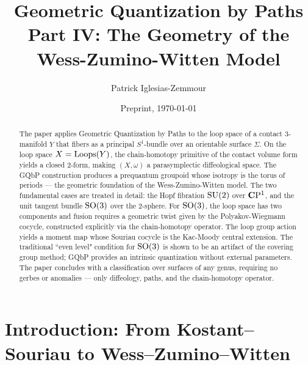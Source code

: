 \documentclass[11pt,reqno,letterpaper,twoside]{amsart}
\title[GQbP IV: WZW Model]{Geometric Quantization by Paths \\ {\scriptsize Part IV: The Geometry of the Wess-Zumino-Witten Model}}
\author{Patrick Iglesias-Zemmour}
\date{Preprint, \today}
\newcommand{\CPOne}{{\fieldC\mathrm{P}^1}}
\begin{document}
  
  
  \begin{abstract}
    The paper applies Geometric Quantization by Paths to the loop space of a contact 3-manifold $Y$ that fibers as a principal $S^1$-bundle over an orientable surface $\Sigma$.
    On the loop space $X = \operatorname{Loops}(Y)$,
    the chain-homotopy primitive of the contact volume form yields a closed 2-form, making $(X, \omega)$ a parasymplectic diffeological space.
    The GQbP construction produces a prequantum groupoid whose isotropy is the torus of periods
    --- the geometric foundation of the Wess-Zumino-Witten model.
    The two fundamental cases are treated in detail:
    the Hopf fibration $\mathrm{SU}(2)$ over $\CPOne$,
    and the unit tangent bundle $\mathrm{SO}(3)$ over the $2$-sphere.
    For $\mathrm{SO}(3)$,
    the loop space has two components and fusion requires a geometric twist given by the Polyakov-Wiegmann cocycle,
    constructed explicitly via the chain-homotopy operator.
    The loop group action yields a moment map whose Souriau cocycle is the Kac-Moody central extension.
    The traditional ``even level" condition for $\mathrm{SO}(3)$ is shown to be an artifact of the covering group method;
    GQbP provides an intrinsic quantization without external parameters.
    The paper concludes with a classification over surfaces of any genus,
    requiring no gerbes or anomalies
    --- only diffeology,
    paths,
    and the chain-homotopy operator.
  \end{abstract}
  
  
  \maketitle
  
  \section*{Introduction: From Kostant--Souriau to Wess--Zumino--Witten}
  
\end{document}
